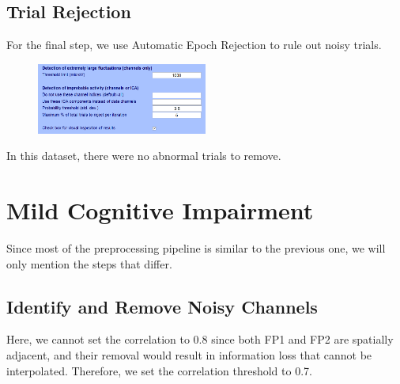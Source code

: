 \documentclass[hidelinks,12pt]{article}
\begin{document}
	\subsection{Trial Rejection}
		For the final step, we use Automatic Epoch Rejection to rule out noisy trials.
		\begin{figure}[h!]
			\centering
			\includegraphics[width=0.5\textwidth]{29}
		\end{figure}
		
		In this dataset, there were no abnormal trials to remove.
	\newpage
	
	\section{Mild Cognitive Impairment}
	
	Since most of the preprocessing pipeline is similar to the previous one, we will only mention the steps that differ.
	
	\subsection{Identify and Remove Noisy Channels}
	Here, we cannot set the correlation to 0.8 since both FP1 and FP2 are spatially adjacent, and their removal would result in information loss that cannot be interpolated. Therefore, we set the correlation threshold to 0.7.
\end{document}
